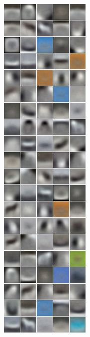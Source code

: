 {\begin{figure}
\begin{subfigure}[b]{0.225\textwidth}
\includegraphics[width=\x, height=\y]{./figures/SATAE/CIFAR_shrink05.png} \caption{}
\end{subfigure} \begin{subfigure}[b]{0.2\textwidth} \centering

\end{subfigure}
\end{figure}}
